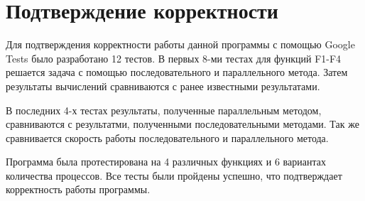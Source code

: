 \documentclass{report}
\begin{document}
\newpage

\section*{Подтверждение корректности}
\par Для подтверждения корректности работы данной программы с помощью  Google Tests было разработано 12 тестов. В первых 8-ми тестах для функций F1-F4 решается задача с помощью последовательного и параллельного метода. Затем результаты вычислений сравниваются с ранее известными результатами.
\par В последних 4-х тестах результаты, полученные параллельным методом, сравниваются с результатми, полученными последовательными методами. Так же сравнивается скорость работы последовательного и параллельного метода.
\par Программа была протестирована на 4 различных функциях и 6 вариантах количества процессов. Все тесты были пройдены успешно, что подтверждает корректность работы программы.

\newpage

\end{document}
